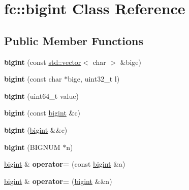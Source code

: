 \hypertarget{classfc_1_1bigint}{}\section{fc\+:\+:bigint Class Reference}
\label{classfc_1_1bigint}
\subsection*{Public Member Functions}
\begin{DoxyCompactItemize}
\item 
\mbox{\label{classfc_1_1bigint_acb4c464f1e016ccb00f0fa5a51a9873f}} 
{\bfseries bigint} (const \mbox{\hyperlink{classstd_1_1vector}{std\+::vector}}$<$ char $>$ \&bige)
\item 
\mbox{\label{classfc_1_1bigint_af1df19a5e31f1b0620299c009d487c09}} 
{\bfseries bigint} (const char $\ast$bige, uint32\+\_\+t l)
\item 
\mbox{\label{classfc_1_1bigint_a7875b887d6497e99944c10aeb6edf319}} 
{\bfseries bigint} (uint64\+\_\+t value)
\item 
\mbox{\label{classfc_1_1bigint_abda40ee38fb31fb92e75f8563ccb55d9}} 
{\bfseries bigint} (const \mbox{\hyperlink{classfc_1_1bigint}{bigint}} \&c)
\item 
\mbox{\label{classfc_1_1bigint_a58132cc8096d969f5f058f346a259abf}} 
{\bfseries bigint} (\mbox{\hyperlink{classfc_1_1bigint}{bigint}} \&\&c)
\item 
\mbox{\label{classfc_1_1bigint_a187e7d0c2cbad88460b3eb61697a5c01}} 
{\bfseries bigint} (B\+I\+G\+N\+UM $\ast$n)
\item 
\mbox{\label{classfc_1_1bigint_a1b72b15a739f7a04bb87b32bb4f153d5}} 
\mbox{\hyperlink{classfc_1_1bigint}{bigint}} \& {\bfseries operator=} (const \mbox{\hyperlink{classfc_1_1bigint}{bigint}} \&a)
\item 
\mbox{\label{classfc_1_1bigint_a3d6a9c0873e3b4e1546003ab9bb3f024}} 
\mbox{\hyperlink{classfc_1_1bigint}{bigint}} \& {\bfseries operator=} (\mbox{\hyperlink{classfc_1_1bigint}{bigint}} \&\&a)

\end{DoxyCompactItemize}
